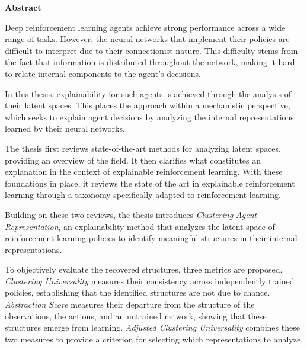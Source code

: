 \cleartorightpage
\thispagestyle{empty}
\label{chap:back_cover}
\begin{center}
  {\LARGE\bfseries \ThesisTitle\par}
  \medskip
  {\large \ThesisAuthor\par}
\end{center}
\bigskip
\noindent\textbf{Abstract}

Deep reinforcement learning agents achieve strong performance across a wide range of tasks.
However, the neural networks that implement their policies are difficult to interpret due to their connectionist nature.
This difficulty stems from the fact that information is distributed throughout the network, making it hard to relate internal components to the agent's decisions.

In this thesis, explainability for such agents is achieved through the analysis of their latent spaces.
This places the approach within a mechanistic perspective, which seeks to explain agent decisions by analyzing the internal representations learned by their neural networks.

The thesis first reviews state-of-the-art methods for analyzing latent spaces, providing an overview of the field.
It then clarifies what constitutes an explanation in the context of explainable reinforcement learning.
With these foundations in place, it reviews the state of the art in explainable reinforcement learning through a taxonomy specifically adapted to reinforcement learning.

Building on these two reviews, the thesis introduces \textit{Clustering Agent Representation}, an explainability method that analyzes the latent space of reinforcement learning policies to identify meaningful structures in their internal representations.

To objectively evaluate the recovered structures, three metrics are proposed.
\textit{Clustering Universality} measures their consistency across independently trained policies, establishing that the identified structures are not due to chance.
\textit{Abstraction Score} measures their departure from the structure of the observations, the actions, and an untrained network, showing that these structures emerge from learning.
\textit{Adjusted Clustering Universality} combines these two measures to provide a criterion for selecting which representations to analyze.

